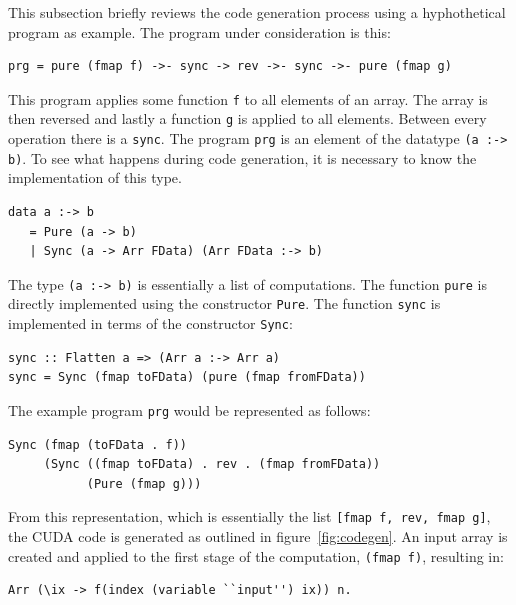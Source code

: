 This subsection briefly reviews the code generation process using 
a hyphothetical program as example. The program under consideration 
is this: 

\begin{small}
\begin{verbatim}
prg = pure (fmap f) ->- sync -> rev ->- sync ->- pure (fmap g) 
\end{verbatim}
\end{small}

This program applies some function {\tt f} to all elements of 
an array. The array is then reversed and lastly a function {\tt g} 
is applied to all elements. Between every operation there is a {\tt sync}.
The program {\tt prg} is an element of the datatype {\tt (a :-> b)}. 
To see what happens during code generation, it is necessary to know 
the implementation of this type.
\begin{small}
\begin{verbatim} 
data a :-> b 
   = Pure (a -> b) 
   | Sync (a -> Arr FData) (Arr FData :-> b) 
\end{verbatim}
\end{small} 
\noindent
The type {\tt (a :-> b)} is essentially a list of computations. The 
function {\tt pure} is directly implemented using the constructor 
{\tt Pure}. The function {\tt sync} is implemented in terms of the 
constructor {\tt Sync}:

\begin{small}
\begin{verbatim} 
sync :: Flatten a => (Arr a :-> Arr a)
sync = Sync (fmap toFData) (pure (fmap fromFData))
\end{verbatim}
\end{small} 
\noindent
The example program {\tt prg} would be represented as follows: 
%
\begin{small}
\begin{verbatim} 
Sync (fmap (toFData . f)) 
     (Sync ((fmap toFData) . rev . (fmap fromFData)) 
           (Pure (fmap g)))   
\end{verbatim}
\end{small} 
\noindent
From this representation, which is essentially the list {\tt [fmap f, rev, fmap g]},
the CUDA code is generated as outlined in figure~\ref{fig:codegen}. 
An input array is created and applied to the first stage of the computation, 
{\tt (fmap f)}, resulting in: 
\begin{small}
\begin{verbatim}
Arr (\ix -> f(index (variable ``input'') ix)) n. 
\end{verbatim}
\end{small}

